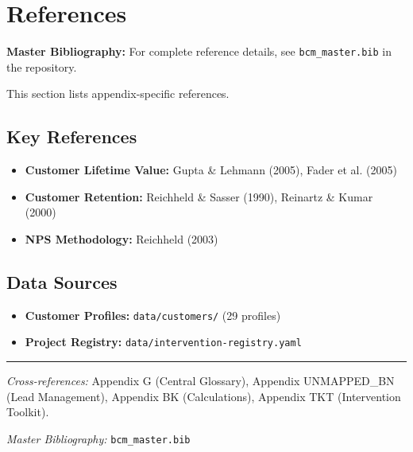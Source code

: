 \section{References}
\label{sec:bp-references}

\begin{tcolorbox}[colback=blue!5!white, colframe=blue!75!black]
\textbf{Master Bibliography:} For complete reference details, see
\texttt{bcm\_master.bib} in the repository.

This section lists appendix-specific references.
\end{tcolorbox}

\subsection{Key References}

\begin{itemize}[nosep]
\item \textbf{Customer Lifetime Value:} Gupta \& Lehmann (2005), Fader et al. (2005)
\item \textbf{Customer Retention:} Reichheld \& Sasser (1990), Reinartz \& Kumar (2000)
\item \textbf{NPS Methodology:} Reichheld (2003)
\end{itemize}

\subsection{Data Sources}

\begin{itemize}[nosep]
\item \textbf{Customer Profiles:} \texttt{data/customers/} (29 profiles)
\item \textbf{Project Registry:} \texttt{data/intervention-registry.yaml}
\end{itemize}



\vspace{1em}
\hrule
\vspace{0.5em}

\noindent\textit{Cross-references:}
Appendix G (Central Glossary),
Appendix UNMAPPED_BN (Lead Management),
Appendix BK (Calculations),
Appendix TKT (Intervention Toolkit).

\noindent\textit{Master Bibliography:} \texttt{bcm\_master.bib}

